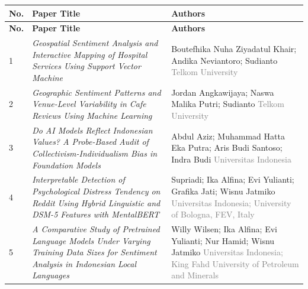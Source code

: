 \documentclass[10pt,a4paper]{article}
\begin{document}
\begin{longtable}{
    |>{\centering\arraybackslash}p{0.7cm}
    |>{\raggedright\arraybackslash}p{8.2cm}
    |>{\raggedright\arraybackslash}p{5.0cm}|
}
\hline
\rowcolor{conf}
\color{white}\textbf{No.} &
\color{white}\textbf{Paper Title} &
\color{white}\textbf{Authors} \\
\hline
\endfirsthead

\hline
\rowcolor{conf}
\color{white}\textbf{No.} &
\color{white}\textbf{Paper Title} &
\color{white}\textbf{Authors} \\
\hline
\endhead

1 &
\textit{Geospatial Sentiment Analysis and Interactive Mapping of Hospital Services Using Support Vector Machine} &
Boutefhika Nuha Ziyadatul Khair; Andika Neviantoro; Sudianto \newline
\textcolor{gray}{Telkom University} \\
\hline

2 &
\textit{Geographic Sentiment Patterns and Venue-Level Variability in Cafe Reviews Using Machine Learning} &
Jordan Angkawijaya; Naswa Malika Putri; Sudianto \newline
\textcolor{gray}{Telkom University} \\
\hline

3 &
\textit{Do AI Models Reflect Indonesian Values? A Probe-Based Audit of Collectivism-Individualism Bias in Foundation Models} &
Abdul Aziz; Muhammad Hatta Eka Putra; Aris Budi Santoso; Indra Budi \newline
\textcolor{gray}{Universitas Indonesia} \\
\hline

4 &
\textit{Interpretable Detection of Psychological Distress Tendency on Reddit Using Hybrid Linguistic and DSM-5 Features with MentalBERT} &
Supriadi; Ika Alfina; Evi Yulianti; Grafika Jati; Wisnu Jatmiko \newline
\textcolor{gray}{Universitas Indonesia; University of Bologna, FEV, Italy} \\
\hline

5 &
\textit{A Comparative Study of Pretrained Language Models Under Varying Training Data Sizes for Sentiment Analysis in Indonesian Local Languages} &
Willy Wilsen; Ika Alfina; Evi Yulianti; Nur Hamid; Wisnu Jatmiko \newline
\textcolor{gray}{Universitas Indonesia; King Fahd University of Petroleum and Minerals} \\
\hline
\end{longtable}
\normalsize
\end{document}
